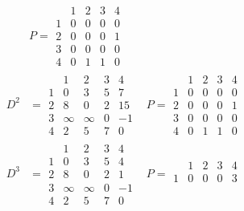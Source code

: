 \documentclass{article}
\begin{document}
\begin{multicols*}{2}
\begin{align*}
            & P = \begin{array}{c|cccc}
                        & 1 & 2 & 3 & 4 \\
                      \hline
                      1 & 0 & 0 & 0 & 0 \\
                      2 & 0 & 0 & 0 & 1 \\
                      3 & 0 & 0 & 0 & 0 \\
                      4 & 0 & 1 & 1 & 0
                  \end{array}                \\
        D^2 & = \begin{array}{c|cccc}
                      & 1      & 2      & 3 & 4  \\
                    \hline
                    1 & 0      & 3      & 5 & 7  \\
                    2 & 8      & 0      & 2 & 15 \\
                    3 & \infty & \infty & 0 & -1 \\
                    4 & 2      & 5      & 7 & 0
                \end{array}
            & P = \begin{array}{c|cccc}
                        & 1 & 2 & 3 & 4 \\
                      \hline
                      1 & 0 & 0 & 0 & 0 \\
                      2 & 0 & 0 & 0 & 1 \\
                      3 & 0 & 0 & 0 & 0 \\
                      4 & 0 & 1 & 1 & 0
                  \end{array}                \\
        D^3 & = \begin{array}{c|cccc}
                      & 1      & 2      & 3 & 4  \\
                    \hline
                    1 & 0      & 3      & 5 & 4  \\
                    2 & 8      & 0      & 2 & 1  \\
                    3 & \infty & \infty & 0 & -1 \\
                    4 & 2      & 5      & 7 & 0
                \end{array}
            & P = \begin{array}{c|cccc}
                        & 1 & 2 & 3 & 4 \\
                      \hline
                      1 & 0 & 0 & 0 & 3 \\

\end{array}
\end{align*}
\end{multicols*}
\end{document}
